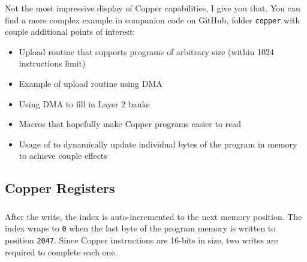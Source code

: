 Not the most impressive display of Copper capabilities, I give you that. You can find a more complex example in companion code on GitHub, folder {\tt copper} with couple additional points of interest:

\begin{itemize}[topsep=1pt,itemsep=1pt]
	\item Upload routine that supports programs of arbitrary size (within 1024 instructions limit)
	\item Example of upload routine using DMA
	\item Using DMA to fill in Layer 2 banks
	\item Macros that hopefully make Copper programs easier to read
	\item Usage of  to dynamically update individual bytes of the program in memory to achieve couple effects
\end{itemize}


\pagebreak
\subsection{Copper Registers}
\label{zx_next_copper_registers}


\subsubsection{}

\begin{NextPort}
\end{NextPort}

After the write, the index is auto-incremented to the next memory position. The index wraps to {\tt 0} when the last byte of the program memory is written to position {\tt 2047}. Since Copper instructions are 16-bits in size, two writes are required to complete each one.


\subsubsection{}

\begin{NextPort}
\end{NextPort}


\subsubsection{}

